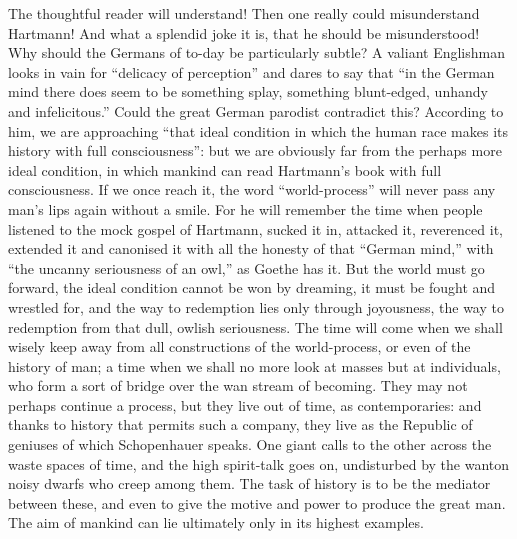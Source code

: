 The thoughtful reader will understand! Then one really could
misunderstand Hartmann! And what a splendid joke it is, that he
should be misunderstood! Why should the Germans of to-day be
particularly subtle? A valiant Englishman looks in vain for \enquote{delicacy
of perception} and dares to say that \enquote{in the German mind there does
seem to be something splay, something blunt-edged, unhandy and
infelicitous.} Could the great German parodist contradict this?
According to him, we are approaching \enquote{that ideal condition in which
the human race makes its history with full consciousness}: but we are
obviously far from the perhaps more ideal condition, in which mankind
can read Hartmann's book with full consciousness. If we once reach
it, the word \enquote{world-process} will never pass any man's lips again
without a smile. For he will remember the time when people listened
to the mock gospel of Hartmann, sucked it in, attacked it, reverenced
it, extended it and canonised it with all the honesty of that \enquote{German mind,} with \enquote{the uncanny seriousness of an owl,} as Goethe has it.
But the world must go forward, the ideal condition cannot be won by
dreaming, it must be fought and wrestled for, and the way to
redemption lies only through joyousness, the way to redemption from
that dull, owlish seriousness. The time will come when we shall
wisely keep away from all constructions of the world-process, or even
of the history of man; a time when we shall no more look at masses
but at individuals, who form a sort of bridge over the wan stream of
becoming. They may not perhaps continue a process, but they live out
of time, as contemporaries: and thanks to history that permits such a
company, they live as the Republic of geniuses of which Schopenhauer
speaks. One giant calls to the other across the waste spaces of time,
and the high spirit-talk goes on, undisturbed by the wanton noisy
dwarfs who creep among them. The task of history is to be the
mediator between these, and even to give the motive and power to
produce the great man. The aim of mankind can lie ultimately only in
its highest examples.

